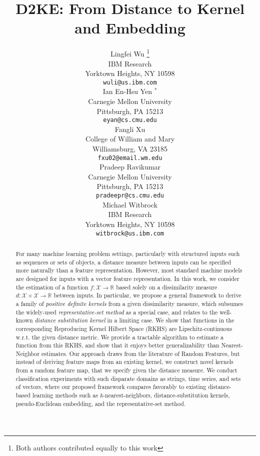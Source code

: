 \documentclass{article}
\title{D2KE: From Distance to Kernel and Embedding}
\author{
   Lingfei Wu \thanks{Both authors contributed equally to this work}\\
   IBM Research\\
   Yorktown Heights, NY 10598\\
   \texttt{wuli@us.ibm.com} \\
   \And
   Ian En-Hsu Yen {\small{$^\ast$}}\\
  Carnegie Mellon University\\
  Pittsburgh, PA 15213 \\
  \texttt{eyan@cs.cmu.edu} \\
  \And
   Fangli Xu \\
  College of William and Mary\\
  Williamsburg, VA 23185 \\
  \texttt{fxu02@email.wm.edu} \\
  \AND
   Pradeep Ravikumar \\
  Carnegie Mellon University\\
  Pittsburgh, PA 15213 \\
  \texttt{pradeepr@cs.cmu.edu} \\
   \And
   Michael Witbrock\\
   IBM Research\\
   Yorktown Heights, NY 10598\\
   \texttt{witbrock@us.ibm.com} \\
}
\newcommand{\R}{\mathbb{R}}
\newcommand{\1}{\mathbf{1}}
\begin{document}

\maketitle

\begin{abstract}
For many machine learning problem settings, particularly with structured inputs such as sequences or sets of objects, a distance measure between inputs can be specified more naturally than a feature representation. However, most standard machine models are designed for inputs with a vector feature representation. In this work, we consider the estimation of a function $f:\mathcal{X} \rightarrow \R$ based solely on a dissimilarity measure $d:\mathcal{X}\times\mathcal{X} \rightarrow \R$ between inputs. In particular, we propose a general framework to derive a family of \emph{positive definite kernels} from a given dissimilarity measure, which subsumes the widely-used \emph{representative-set method} as a special case, and relates to the well-known \emph{distance substitution kernel} in a limiting case. We show that functions in the corresponding Reproducing Kernel Hilbert Space (RKHS) are Lipschitz-continuous w.r.t. the given distance metric. We provide a tractable algorithm to estimate a function from this RKHS, and show that it enjoys better generalizability than Nearest-Neighbor estimates. Our approach draws from the literature of Random Features, but instead of deriving feature maps from an existing kernel, we construct novel kernels from a random feature map, that we specify given the distance measure. We conduct classification experiments with such disparate domains as strings, time series, and sets of vectors, where our proposed framework compares favorably to existing distance-based learning methods such as $k$-nearest-neighbors, distance-substitution kernels, pseudo-Euclidean embedding, and the representative-set method.
\end{abstract}
\end{document}
